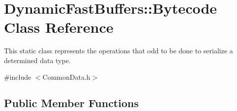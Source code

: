 \hypertarget{class_dynamic_fast_buffers_1_1_bytecode}{\section{Dynamic\-Fast\-Buffers\-:\-:Bytecode Class Reference}
\label{class_dynamic_fast_buffers_1_1_bytecode}
}


This static class represents the operations that odd to be done to serialize a determined data type.  




{\ttfamily \#include $<$Common\-Data.\-h$>$}

\subsection*{Public Member Functions}

